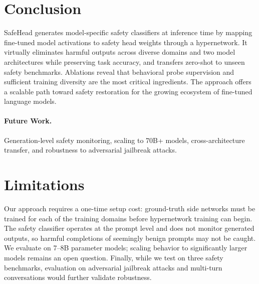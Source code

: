 \documentclass[11pt]{article}
\newcommand{\method}{SafeHead}
\begin{document}
\section{Conclusion}
\label{sec:conclusion}

\method{} generates model-specific safety classifiers at inference time by mapping fine-tuned model activations to safety head weights through a hypernetwork. It virtually eliminates harmful outputs across diverse domains and two model architectures while preserving task accuracy, and transfers zero-shot to unseen safety benchmarks. Ablations reveal that behavioral probe supervision and sufficient training diversity are the most critical ingredients. The approach offers a scalable path toward safety restoration for the growing ecosystem of fine-tuned language models.

\paragraph{Future Work.} Generation-level safety monitoring, scaling to 70B+ models, cross-architecture transfer, and robustness to adversarial jailbreak attacks.


\section*{Limitations}

Our approach requires a one-time setup cost: ground-truth side networks must be trained for each of the training domains before hypernetwork training can begin. The safety classifier operates at the prompt level and does not monitor generated outputs, so harmful completions of seemingly benign prompts may not be caught. We evaluate on 7--8B parameter models; scaling behavior to significantly larger models remains an open question. Finally, while we test on three safety benchmarks, evaluation on adversarial jailbreak attacks and multi-turn conversations would further validate robustness.





\appendix
\end{document}
